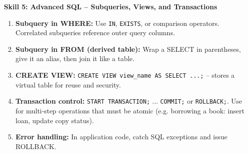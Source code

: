 \documentclass[11pt]{article}
\begin{document}
\textbf{Skill 5: Advanced SQL – Subqueries, Views, and Transactions}\par
\begin{methode}
\begin{enumerate}
\item \textbf{Subquery in WHERE:} Use \texttt{IN}, \texttt{EXISTS}, or comparison operators. Correlated subqueries reference outer query columns.
\item \textbf{Subquery in FROM (derived table):} Wrap a SELECT in parentheses, give it an alias, then join it like a table.
\item \textbf{CREATE VIEW:} \texttt{CREATE VIEW view\_name AS SELECT ...;} -- stores a virtual table for reuse and security.
\item \textbf{Transaction control:} \texttt{START TRANSACTION;} ... \texttt{COMMIT;} or \texttt{ROLLBACK;}. Use for multi‑step operations that must be atomic (e.g. borrowing a book: insert loan, update copy status).
\item \textbf{Error handling:} In application code, catch SQL exceptions and issue ROLLBACK.
\end{enumerate}
\end{methode}
\end{document}
